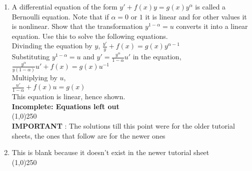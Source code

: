 \documentclass[a4paper]{article}
\begin{document}
\begin{enumerate}
{}
\item{A differential equation of the form $y' + f(x)y = g(x)y^\alpha$ is called a Bernoulli equation. Note that if $\alpha = 0$ or $1$ it is linear and for other values it is nonlinear. Show that the transformation $y^{1-\alpha} = u$ converts it into a linear equation. Use this to solve the following equations.
\\Divinding the equation by $y$,
$\frac{y'}{y} + f(x) = g(x)y^{\alpha-1}$
\\Substituting $y^{1-\alpha} = u$ and $y'=\frac{y^\alpha}{1-\alpha}u'$ in the equation,
\\$\frac{y^\alpha}{y(1-\alpha)}u'+f(x)=g(x)u^{-1}$
\\Multiplying by $u$,
\\$\frac{u'}{1-\alpha} + f(x)u=g(x)$
\\This equation is linear, hence shown.
\\\textbf{Incomplete: Equations left out}
}
\\\line(1,0){250}
\\\textbf{IMPORTANT} : The solutions till this point were for the older tutorial sheets, the ones that follow are for the newer ones
\item{This is blank because it doesn't exist in the newer tutorial sheet}
\\\line(1,0){250}


\end{enumerate}
\end{document}
